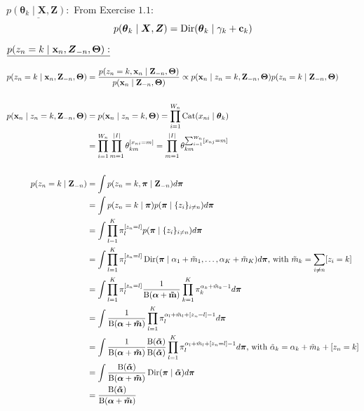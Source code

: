 \begin{enumerate}
   \textbf{$\underline{p(\boldsymbol{\theta}_k \mid \boldsymbol{X}, \boldsymbol{Z}):}$} 
   From Exercise $1.1$:
   \[
     p(\boldsymbol{\theta}_k \mid \boldsymbol{X}, \boldsymbol{Z}) = \operatorname{Dir}(\boldsymbol{\theta}_k \mid \mathbf{\gamma}_k + \mathbf{c}_k)
   \]
   
   \textbf{$\underline{p(z_n = k \mid \bold{x}_n, \boldsymbol{Z}_{-n}, \bold{\Theta}):}$} 

   \begin{align*}
       p(z_n = k \mid \bold{x}_n, \mathbf{Z}_{-n}, \bold{\Theta}) &= \frac{p(z_n = k, \bold{x}_n \mid \mathbf{Z}_{-n}, \bold{\Theta})}{p(\bold{x}_n \mid \mathbf{Z}_{-n}, \bold{\Theta})} \propto p(\bold{x}_n \mid z_n = k, \mathbf{Z}_{-n}, \bold{\Theta})  p(z_n = k \mid \mathbf{Z}_{-n}, \bold{\Theta}) 
       \\\\
       p(\bold{x}_n \mid z_n = k, \mathbf{Z}_{-n}, \bold{\Theta}) &= p(\bold{x}_n \mid z_n = k, \bold{\Theta}) = \prod_{i=1}^{W_n}\operatorname{Cat}(x_{ni} \mid\boldsymbol{\theta}_k) \\
       &= \prod_{i=1}^{W_n} \prod_{m=1}^{\vert I \vert} \theta_{km}^{[x_{ni} = m]} = \prod_{m=1}^{\vert I \vert} \theta_{km}^{\sum_{i=1}^{W_n}[x_{nj} = m]} 
       \\\\
       p(z_n = k \mid \mathbf{Z}_{-n}) &= \int p(z_n= k, \boldsymbol{\pi}\mid \mathbf{Z}_{-n})d\boldsymbol{\pi} \\
       &= \int p(z_n = k \mid \boldsymbol{\pi}) p(\boldsymbol{\pi} \mid \{z_i\}_{i \neq n}) d\boldsymbol{\pi} \\
       &= \int \prod_{l=1}^K\pi_l^{[z_n = l]} p(\boldsymbol{\pi} \mid \{z_i\}_{i \neq n}) d\boldsymbol{\pi} \\
       &= \int \prod_{l=1}^K\pi_l^{[z_n = l]} \operatorname{Dir}(\boldsymbol{\pi} \mid \alpha_1 + \Tilde{m}_1, \ldots, \alpha_K + \Tilde{m}_K)d\boldsymbol{\pi} \text{, with } \Tilde{m}_k = \sum_{i \neq n} [z_i = k] \\
       &= \int \prod_{l=1}^K\pi_l^{[z_n = l]} \frac{1}{\operatorname{B}(\boldsymbol{\alpha} + \mathbf{\Tilde{m}})} \prod_{k=1}^K \pi_k^{\alpha_k + \Tilde{m}_k -1} d\boldsymbol{\pi} \\
       &= \int \frac{1}{\operatorname{B}(\boldsymbol{\alpha} + \boldsymbol{\Tilde{m}})} \prod_{l=1}^K \pi_l^{\alpha_l + \Tilde{m}_l + [z_n = l] -1} d\boldsymbol{\pi} \\
       &= \int \frac{1}{\operatorname{B}(\boldsymbol{\alpha} + \boldsymbol{\Tilde{m}})} \frac{\operatorname{B}(\boldsymbol{\Tilde{\alpha}})}{\operatorname{B}(\boldsymbol{\Tilde{\alpha}})}\prod_{l=1}^K \pi_l^{\alpha_l + \Tilde{m}_l + [z_n = l] -1} d\boldsymbol{\pi} \text{, with } \Tilde{\alpha}_k = \alpha_k + \Tilde{m}_k + [z_n = k]\\
       &= \int \frac{\operatorname{B}(\boldsymbol{\Tilde{\alpha}})}{\operatorname{B}(\boldsymbol{\alpha} + \boldsymbol{\Tilde{m}})} \operatorname{Dir}(\boldsymbol{\pi} \mid \boldsymbol{\Tilde{\alpha}}) d\boldsymbol{\pi}\\
       &= \frac{\operatorname{B}(\boldsymbol{\Tilde{\alpha}})}{\operatorname{B}(\boldsymbol{\alpha} + \boldsymbol{\Tilde{m}})} \\
   \end{align*}
   

\end{enumerate}

